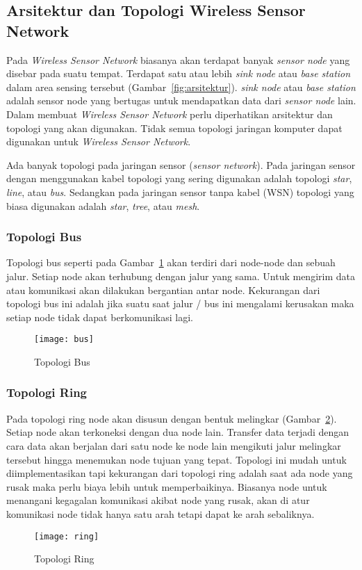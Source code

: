 \subsection{Arsitektur dan Topologi Wireless Sensor Network}
Pada \textit{Wireless Sensor Network} biasanya akan terdapat banyak \textit{sensor node} yang disebar pada suatu tempat. Terdapat satu atau lebih \textit{sink node} atau \textit{base station} dalam area sensing tersebut (Gambar~\ref{fig:arsitektur}). \textit{sink node} atau \textit{base station} adalah sensor node yang bertugas untuk mendapatkan data dari \textit{sensor node} lain. Dalam membuat \textit{Wireless Sensor Network} perlu diperhatikan arsitektur dan topologi yang akan digunakan. Tidak semua topologi jaringan komputer dapat digunakan untuk \textit{Wireless Sensor Network}. 

Ada banyak topologi pada jaringan sensor (\textit{sensor network}). Pada jaringan sensor dengan menggunakan kabel topologi yang sering digunakan adalah topologi \textit{star}, \textit{line}, atau \textit{bus}. Sedangkan pada jaringan sensor tanpa kabel (WSN) topologi yang biasa digunakan adalah \textit{star}, \textit{tree}, atau \textit{mesh}. 

\subsubsection{Topologi Bus}
Topologi bus seperti pada Gambar~\ref{fig:bus} akan terdiri dari node-node dan sebuah jalur. Setiap node akan terhubung dengan jalur yang sama. Untuk mengirim data atau komunikasi akan dilakukan bergantian antar node. Kekurangan dari topologi bus ini adalah jika suatu saat jalur / bus ini mengalami kerusakan maka setiap node tidak dapat berkomunikasi lagi.
\begin{figure} [H]
	\centering  
	\texttt{[image: bus]}  
	\caption[Topologi Bus]{Topologi Bus} 
	\label{fig:bus} 
\end{figure} 

\subsubsection{Topologi Ring}
Pada topologi ring node akan disusun dengan bentuk melingkar (Gambar~\ref{fig:ring}). Setiap node akan terkoneksi dengan dua node lain. Transfer data terjadi dengan cara data akan berjalan dari satu node ke node lain mengikuti jalur melingkar tersebut hingga menemukan node tujuan yang tepat. Topologi ini mudah untuk diimplementasikan tapi kekurangan dari topologi ring adalah saat ada node yang rusak maka perlu biaya lebih untuk memperbaikinya. Biasanya node untuk menangani kegagalan komunikasi akibat node yang rusak, akan di atur komunikasi node tidak hanya satu arah tetapi dapat ke arah sebaliknya.
\begin{figure} [H]
	\centering  
	\texttt{[image: ring]}  
	\caption[Topologi Ring]{Topologi Ring} 
	\label{fig:ring} 
\end{figure} 

